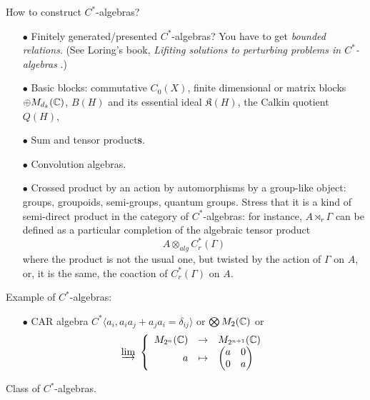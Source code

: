 How to construct $C^*$-algebras?\\
\begin{itemize}
\item[$\bullet$] Finitely generated/presented $C^*$-algebras? You have to get \textit{bounded relations}. (See Loring's book, \textit{Lifiting solutions to perturbing problems in $C^*$-algebras} \cite{Loring}.) \\

\item[$\bullet$] Basic blocks: commutative $C_0(X)$, finite dimensional or matrix blocks $\oplus M_{d_k}(\mathbb C)$, $B(H)$ and its essential ideal $\mathfrak K(H)$, the Calkin quotient $Q(H)$,\\

\item[$\bullet$] Sum and tensor product\textbf{s}.\\ 
\item[$\bullet$] Convolution algebras.\\
\item[$\bullet$] Crossed product by an action by automorphisms by a group-like object: groups, groupoids, semi-groups, quantum groups. Stress that it is a kind of semi-direct product in the category of $C^*$-algebras: for instance, $A\rtimes_r \Gamma$ can be defined as a particular completion of the algebraic tensor product
\[A\otimes_{alg} C^*_r(\Gamma)\]
where the product is not the usual one, but twisted by the action of $\Gamma$ on $A$, or, it is the same, the coaction of $C^*_r(\Gamma)$ on $A$.\\
\end{itemize}

Example of $C^*$-algebras:\\

\begin{itemize}
\item[$\bullet$] CAR algebra $C^*\langle a_i , a_i a_j +a_j a_i = \delta_{ij} \rangle $ or $\bigotimes M_2(\mathbb C)$ or 
\[\varinjlim \ 
\left\{\begin{array}{rcl} 
M_{2^n}(\C) & \rightarrow & M_{2^{n+1}}(\C) \\ 
a           & \mapsto     & \begin{pmatrix} a & 0 \\ 0 & a\end{pmatrix}\end{array}\right.\]
\end{itemize}

Class of $C^*$-algebras.\\

